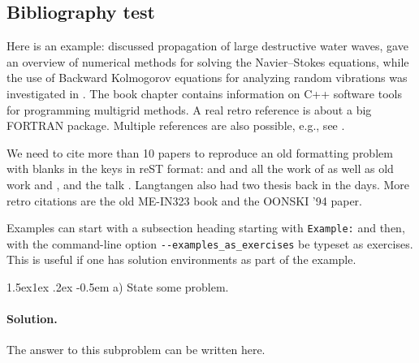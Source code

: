 \n\documentclass[%
oneside,                 %
final,                   %
10pt]{article}
\makeatletter
\newenvironment{doconceexercise}{}{}
\newcounter{doconceexercisecounter}
\newcommand\subex{\@startsection{paragraph}{4}{\z@}%
                  {1.5ex\@plus1ex \@minus.2ex}%
                  {-0.5em}%
                  {\normalfont\normalsize\bfseries}}
\theoremstyle{definition}
\makeatother
\begin{document}
\begin{enumerate}
\subsection{Bibliography test}

Here is an example: \cite{Langtangen_Pedersen_2002} discussed propagation of
large destructive water waves, \cite{Langtangen_et_al_2002} gave
an overview of numerical methods for solving the Navier--Stokes equations,
while the use of Backward Kolmogorov equations for analyzing
random vibrations was investigated in \cite{Langtangen_1994a}.
The book chapter \cite{Mardal_et_al_2003a} contains information on
C++ software tools for programming multigrid methods. A real retro
reference is \cite{Langtangen_1988d} about a big FORTRAN package.
Multiple references are also possible, e.g., see
\cite{Langtangen_Pedersen_2002,Mardal_et_al_2003a}.

We need to cite more than 10 papers to reproduce an old formatting
problem with blanks in the keys in reST format:
\cite{Langtangen_1992c,Langtangen_1994a,Mortensen_et_al_2011,Langtangen_Pedersen_2002}
and
\cite{Langtangen_et_al_2002,Glimsdal_et_al_20006,Rahman_et_al_2006b,Haga_et_al_2011a,Langtangen_2003a,Langtangen_2008a,Langtangen:95}
and all the work of
\cite{Langtangen_2012,Mardal_et_al_2003a,Jeberg_et_al_2004} as well as
old work \cite{Langtangen_1988d} and \cite{Langtangen_1989e}, and the
talk \cite{Langtangen_talk_2007a}.
Langtangen also had two thesis \cite{Langtangen:85,Langtangen_1989e}
back in the days.
More retro citations are
the old ME-IN323 book \cite{Langtangen:91} and the
\cite{Langtangen:94b} OONSKI '94 paper.

\begin{doconceexercise}

                             
\label{Example}

Examples can start with a subsection heading starting with \texttt{Example:}
and then, with the command-line option \Verb!--examples_as_exercises! be
typeset as exercises. This is useful if one has solution
environments as part of the example.

\subex{a)}
State some problem.

\paragraph{Solution.}
The answer to this subproblem can be written here.


\end{doconceexercise}
\end{enumerate}
\end{document}
